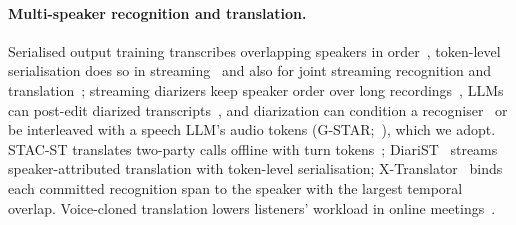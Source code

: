 \paragraph{Multi-speaker recognition and translation.} Serialised output training transcribes overlapping speakers
in order~\citep{kanda2020sot,kanda2021saasr}, token-level serialisation does so in streaming~\citep{kanda2022tsot} and
also for joint streaming recognition and translation~\citep{papi2023tsot}; streaming diarizers keep speaker order over
long recordings~\citep{park2024sortformer,medennikov2025streaming}, LLMs can post-edit diarized
transcripts~\citep{wang2024diarizationlm}, and diarization can condition a recogniser~\citep{polok2026dicow,huo2026tagspeech}
or be interleaved with a speech LLM's audio tokens (G-STAR;~\citealp{peng2026gstar}), which we adopt. STAC-ST translates
two-party calls offline with turn tokens~\citep{zuluaga2023stac}; DiariST~\citep{yang2024diarist} streams
speaker-attributed translation with token-level serialisation; X-Translator~\citep{zhao2026xtranslator} binds each
committed recognition span to the speaker with the largest temporal overlap. Voice-cloned translation lowers listeners'
workload in online meetings~\citep{ma2026samevoice}.
